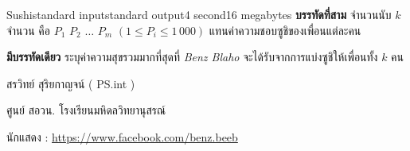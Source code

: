 \documentclass[11pt,a4paper]{article}
\begin{document}
\begin{problem}{Sushi}{standard input}{standard output}{4 second}{16 megabytes}
\textbf{บรรทัดที่สาม} จำนวนนับ $k$ จำนวน คือ $P_1$ $P_2$ $…$ $P_m$ $( 1 \leq P_i \leq 1\,000 )$ แทนค่าความชอบซูชิของเพื่อนแต่ละคน


\OutputFile

\textbf{มีบรรทัดเดียว} ระบุค่าความสุขรวมมากที่สุดที่ \textit{Benz Blaho} จะได้รับจากการแบ่งซูชิให้เพื่อนทั้ง $k$ คน

\Examples

\begin{example}
%
%
\end{example}


\Source

สรวิทย์  สุริยกาญจน์ ( PS.int )

ศูนย์ สอวน. โรงเรียนมหิดลวิทยานุสรณ์

นักแสดง :  \url{https://www.facebook.com/benz.beeb}


\end{problem}
\end{document}

